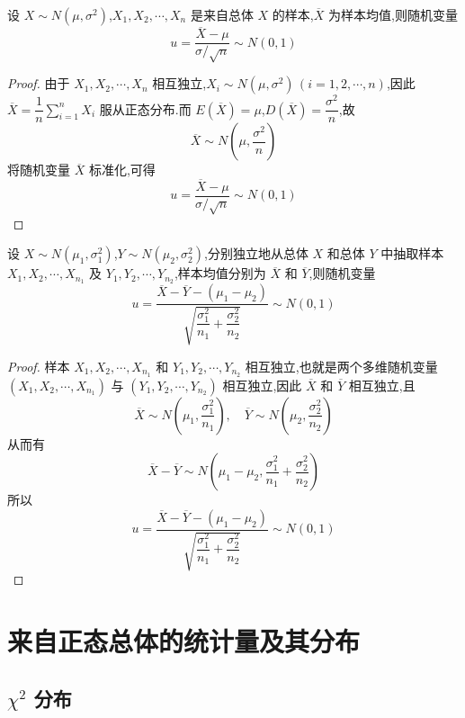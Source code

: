 \begin{theorem} \label{theorem:正态总体的样本均值服从正态分布}
    设 $X \sim N(\mu, \sigma^2)$,$X_1, X_2, \cdots, X_n$ 是来自总体 $X$ 的样本,$\overline{X}$ 为样本均值,则随机变量
    $$
    u = \dfrac{\overline{X} - \mu}{\sigma / \sqrt{n}} \sim N(0,1)
    $$
\end{theorem}

\begin{proof}
    由于 $X_1, X_2, \cdots, X_n$ 相互独立,$X_i \sim N(\mu, \sigma^2) \, (i=1,2,\cdots,n)$,因此 $\overline{X} = \dfrac{1}{n} \displaystyle\sum_{i=1}^n X_i$ 服从正态分布.而 $E(\overline{X}) = \mu$,$D(\overline{X}) = \dfrac{\sigma^2}{n}$,故
    $$
    \overline{X} \sim N(\mu, \dfrac{\sigma^2}{n})
    $$
    将随机变量 $\overline{X}$ 标准化,可得
    $$
    u = \dfrac{\overline{X} - \mu}{\sigma / \sqrt{n}} \sim N(0,1)
    $$
\end{proof}

\begin{theorem} \label{theorem:两个正太总体的样本均值}
    设 $X \sim N(\mu_1, \sigma_1^2)$,$Y \sim N(\mu_2, \sigma_2^2)$,分别独立地从总体 $X$ 和总体 $Y$ 中抽取样本 $X_1, X_2, \cdots, X_{n_1}$ 及 $Y_1, Y_2, \cdots, Y_{n_2}$,样本均值分别为 $\overline{X}$ 和 $\overline{Y}$,则随机变量
    $$
    u = \dfrac{\overline{X} - \overline{Y} - (\mu_1 - \mu_2)}{\sqrt{\dfrac{\sigma_1^2}{n_1} + \dfrac{\sigma_2^2}{n_2}}} \sim N(0,1)
    $$
\end{theorem}

\begin{proof}
    样本 $X_1, X_2, \cdots, X_{n_1}$ 和 $Y_1, Y_2, \cdots, Y_{n_2}$ 相互独立,也就是两个多维随机变量 $(X_1, X_2, \cdots, X_{n_1})$ 与 $(Y_1, Y_2, \cdots, Y_{n_2})$ 相互独立,因此 $\overline{X}$ 和 $\overline{Y}$ 相互独立,且
    $$
    \overline{X} \sim N(\mu_1, \dfrac{\sigma_1^2}{n_1}), \quad \overline{Y} \sim N(\mu_2, \dfrac{\sigma_2^2}{n_2})
    $$
    从而有
    $$
    \overline{X} - \overline{Y} \sim N(\mu_1 - \mu_2, \dfrac{\sigma_1^2}{n_1} + \dfrac{\sigma_2^2}{n_2})
    $$
    所以
    $$
    u = \dfrac{\overline{X} - \overline{Y} - (\mu_1 - \mu_2)}{\sqrt{\dfrac{\sigma_1^2}{n_1} + \dfrac{\sigma_2^2}{n_2}}} \sim N(0,1)
    $$
\end{proof}

\section{来自正态总体的统计量及其分布}

\subsection{\texorpdfstring{$\chi^2$}{} 分布}

